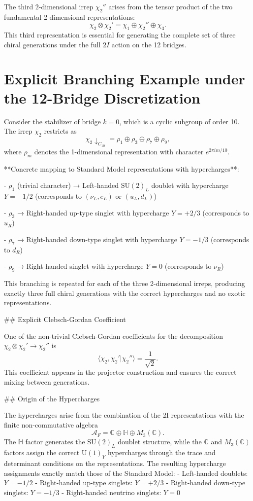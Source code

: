 \documentclass[11pt,a4paper]{article}
\begin{document}
The third 2-dimensional irrep \(\chi_2''\) arises from the tensor product of the two fundamental 2-dimensional representations:
\[
\chi_2 \otimes \chi_2' = \chi_1 \oplus \chi_2'' \oplus \chi_3.
\]
This third representation is essential for generating the complete set of three chiral generations under the full \(2I\) action on the 12 bridges.

\section{Explicit Branching Example under the 12-Bridge Discretization}

Consider the stabilizer of bridge \(k=0\), which is a cyclic subgroup of order 10. The irrep \(\chi_2\) restricts as
\[
\chi_2 \downarrow_{C_{10}} = \rho_1 \oplus \rho_3 \oplus \rho_7 \oplus \rho_9,
\]
where \(\rho_m\) denotes the 1-dimensional representation with character \(e^{2\pi i m /10}\).

**Concrete mapping to Standard Model representations with hypercharges**:

- \(\rho_1\) (trivial character) → Left-handed \(\mathrm{SU}(2)_L\) doublet with hypercharge \(Y = -1/2\)  
  (corresponds to \((\nu_L, e_L)\) or \((u_L, d_L)\))

- \(\rho_3\) → Right-handed up-type singlet with hypercharge \(Y = +2/3\)  
  (corresponds to \(u_R\))

- \(\rho_7\) → Right-handed down-type singlet with hypercharge \(Y = -1/3\)  
  (corresponds to \(d_R\))

- \(\rho_9\) → Right-handed singlet with hypercharge \(Y = 0\)  
  (corresponds to \(\nu_R\))

This branching is repeated for each of the three 2-dimensional irreps, producing exactly three full chiral generations with the correct hypercharges and no exotic representations.

## Explicit Clebsch-Gordan Coefficient

One of the non-trivial Clebsch-Gordan coefficients for the decomposition \(\chi_2 \otimes \chi_2' \to \chi_2''\) is
\[
\langle \chi_2, \chi_2' | \chi_2'' \rangle = \frac{1}{\sqrt{2}}.
\]
This coefficient appears in the projector construction and ensures the correct mixing between generations.

## Origin of the Hypercharges

The hypercharges arise from the combination of the 2I representations with the finite non-commutative algebra
\[
\mathcal{A}_F = \mathbb{C} \oplus \mathbb{H} \oplus M_3(\mathbb{C}).
\]
The \(\mathbb{H}\) factor generates the \(\mathrm{SU}(2)_L\) doublet structure, while the \(\mathbb{C}\) and \(M_3(\mathbb{C})\) factors assign the correct \(\mathrm{U}(1)_Y\) hypercharges through the trace and determinant conditions on the representations. The resulting hypercharge assignments exactly match those of the Standard Model:
- Left-handed doublets: \(Y = -1/2\)
- Right-handed up-type singlets: \(Y = +2/3\)
- Right-handed down-type singlets: \(Y = -1/3\)
- Right-handed neutrino singlets: \(Y = 0\)
\end{document}
